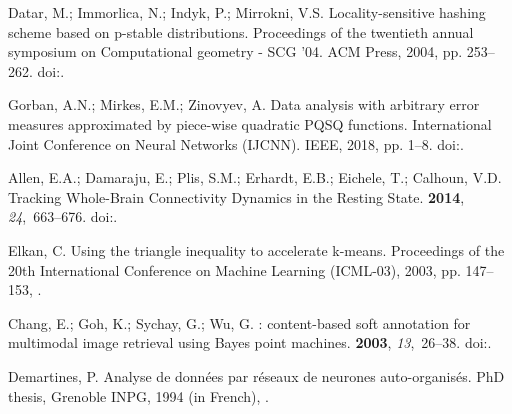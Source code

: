 \documentclass[entropy,article,submit,moreauthors,pdftex]{Definitions/mdpi}
\begin{document}
\begin{thebibliography}{-------}
Datar, M.; Immorlica, N.; Indyk, P.; Mirrokni, V.S.
\newblock Locality-sensitive hashing scheme based on p-stable distributions.
\newblock  Proceedings of the twentieth annual symposium on Computational
  geometry - {SCG} '04. {ACM} Press,  2004, pp. 253--262.
\newblock
  doi:{\href{https://doi.org/10.1145/997817.997857}{}}.

Gorban, A.N.; Mirkes, E.M.; Zinovyev, A.
\newblock Data analysis with arbitrary error measures approximated by
  piece-wise quadratic PQSQ functions.
 International Joint Conference on Neural Networks (IJCNN).
  IEEE,  2018, pp. 1--8.
\newblock
  doi:{\href{https://doi.org/10.1109/ijcnn.2018.8489568}{}}.

Allen, E.A.; Damaraju, E.; Plis, S.M.; Erhardt, E.B.; Eichele, T.; Calhoun,
  V.D.
\newblock Tracking Whole-Brain Connectivity Dynamics in the Resting State.
 {\bf 2014}, {\em 24},~663--676.
\newblock
  doi:{\href{https://doi.org/10.1093/cercor/bhs352}{}}.

Elkan, C.
\newblock Using the triangle inequality to accelerate k-means.
\newblock  Proceedings of the 20th International Conference on Machine Learning
  (ICML-03),  2003, pp. 147--153,
  \href{https://www.aaai.org/Papers/ICML/2003/ICML03-022.pdf}{{}}.

Chang, E.; Goh, K.; Sychay, G.; Wu, G.
: content-based soft annotation for multimodal image retrieval
  using Bayes point machines.
 {\bf 2003}, {\em 13},~26--38.
\newblock
  doi:{\href{https://doi.org/10.1109/tcsvt.2002.808079}{}}.

Demartines, P.
\newblock Analyse de donn{\'e}es par r{\'e}seaux de neurones
  auto-organis{\'e}s.
\newblock PhD thesis, Grenoble INPG,  1994 (in French),
  \href{https://www.theses.fr/1994INPG0129}{{}}.


\end{thebibliography}
\end{document}
